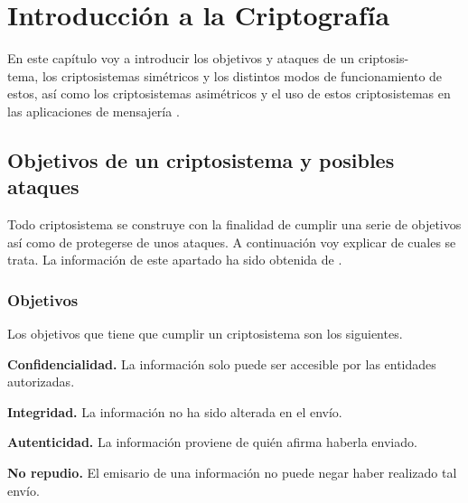 \chapter{Introducción a la Criptografía}
En este capítulo voy a introducir los objetivos y ataques de un criptosis-\\tema, los criptosistemas simétricos y los distintos modos de funcionamiento de estos, así como los criptosistemas asimétricos y el uso de estos  criptosistemas en las aplicaciones de mensajería .

\section{Objetivos de un criptosistema y posibles ataques}
Todo criptosistema se construye con la finalidad de cumplir una serie de objetivos así como de protegerse de unos ataques. A continuación voy explicar de cuales se trata.
La información de este apartado ha sido obtenida de \cite{apuntesCriptografia}.\\ 
\subsection{Objetivos}
Los objetivos que tiene que cumplir un criptosistema son los siguientes.
\begin{description}
	\item \textbf{Confidencialidad.} 
		 La información solo puede ser accesible por las entidades autorizadas. 
	\item \textbf{Integridad.} 
		La información no ha sido alterada en el envío.
	\item \textbf{Autenticidad.} 
		La información proviene de quién afirma haberla enviado.
	\item \textbf{No repudio.}  
		El emisario de una información no puede negar haber realizado tal envío.
\end{description}
